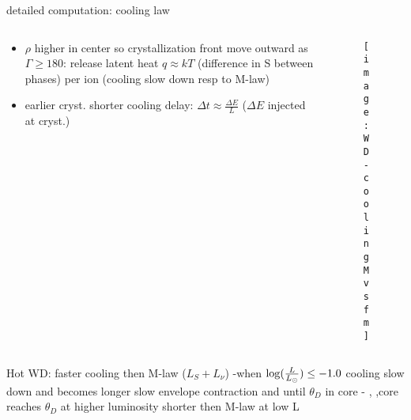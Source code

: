 \begin{frame}{detailed computation: cooling law}
\begin{columns}[T]
	\begin{column}{0.45\textwidth}
		\begin{itemize}
			\item $\rho$ higher in center so crystallization front move outward as $\Gamma\geq180$: release latent heat $q\approx kT$ (difference in S between phases) per ion (cooling slow down resp to M-law)
			\item earlier cryst. shorter cooling delay: $\Delta t\approx\frac{\Delta E}{L}$ ($\Delta E$ injected at cryst.)
		\end{itemize}
	\end{column}
	\begin{column}{0.5\textwidth}
		\begin{figure}[!ht]
			\texttt{[image: WD-coolingMvsfm]}\label{fig:WD-coolingMvsfm}
		\end{figure}
\end{column}\end{columns}
Hot WD: faster cooling then M-law ($L_S+L_{\nu}$) -when $\log(\frac{L}{L_{\odot}})\leq-1.0$ cooling slow down and becomes longer slow envelope contraction and  until $\theta_D$ in core - , ,core reaches $\theta_D$ at higher luminosity  shorter then M-law at low L
\end{frame}


